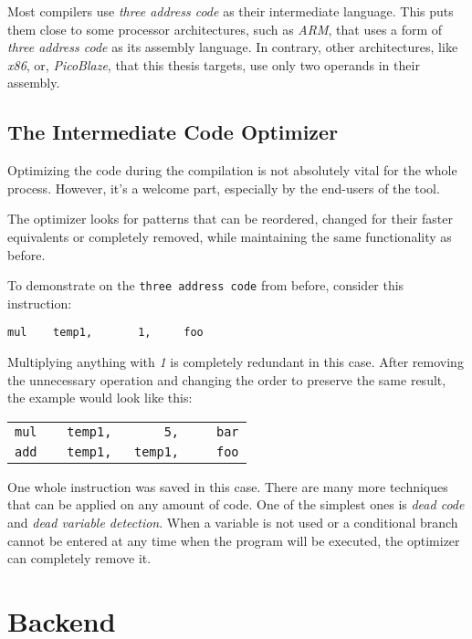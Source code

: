             Most compilers use \emph{three address code} as their intermediate language. This puts them close to some processor architectures, such as \emph{ARM}, that uses a form of \emph{three address code} as its assembly language. In contrary, other architectures, like \emph{x86}, or, \emph{PicoBlaze}, that this thesis targets, use only two operands in their assembly.

        \subsection{The Intermediate Code Optimizer}

            Optimizing the code during the compilation is not absolutely vital for the whole process. However, it's a welcome part, especially by the end-users of the tool.

            The optimizer looks for patterns that can be reordered, changed for their faster equivalents or completely removed, while maintaining the same functionality as before.

            To demonstrate on the \texttt{three address code} from before, consider this instruction:

            \begin{center}\verb|mul    temp1,       1,     foo|\end{center}

            Multiplying anything with \emph{1} is completely redundant in this case. After removing the unnecessary operation and changing the order to preserve the same result, the example would look like this:

            \begin{center}\begin{tabular}{l}
            \verb|mul    temp1,       5,     bar|\\
            \verb|add    temp1,   temp1,     foo|\\
            \end{tabular}\end{center}

            One whole instruction was saved in this case. There are many more techniques that can be applied on any amount of code. One of the simplest ones is \emph{dead code} and \emph{dead variable detection}. When a variable is not used or a conditional branch cannot be entered at any time when the program will be executed, the optimizer can completely remove it.

    \section{Back\-end}

